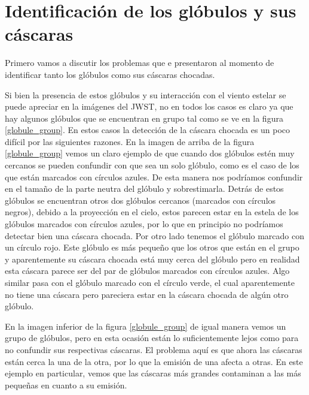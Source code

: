\documentclass{book}
\begin{document}
\section{Identificación de los glóbulos y sus cáscaras}\label{dis:casaras}

Primero vamos a discutir los problemas que e presentaron al momento de identificar tanto los glóbulos como sus cáscaras chocadas.

Si bien la presencia de estos glóbulos y su interacción con el viento estelar se puede apreciar en la imágenes del JWST, no en todos los casos es claro ya que hay algunos glóbulos que se encuentran en grupo tal como se ve en la figura \ref{globule_group}. En estos casos la detección de la cáscara chocada es un poco difícil por las siguientes razones. En la imagen de arriba de la figura \ref{globule_group} vemos un claro ejemplo de que cuando dos glóbulos estén muy cercanos se pueden confundir con que sea un solo glóbulo, como es el caso de los que están marcados con círculos azules. De esta manera nos podríamos confundir en el tamaño de la parte neutra del glóbulo y sobrestimarla. Detrás de estos glóbulos se encuentran otros dos glóbulos cercanos (marcados con círculos negros), debido a la proyección en el cielo, estos parecen estar en la estela de los glóbulos marcados con círculos azules, por lo que en principio no podríamos detectar bien una cáscara chocada. Por otro lado tenemos el glóbulo marcado con un círculo rojo. Este glóbulo es más pequeño que los otros que están en el grupo y aparentemente su cáscara chocada está muy cerca del glóbulo pero en realidad esta cáscara parece ser del par de glóbulos marcados con círculos azules. Algo similar pasa con el glóbulo marcado con el círculo verde, el cual aparentemente no tiene una cáscara pero pareciera estar en la cáscara chocada de algún otro glóbulo.

En la imagen inferior de la figura \ref{globule_group} de igual manera vemos un grupo de glóbulos, pero en esta ocasión están lo suficientemente lejos como para no confundir sus respectivas cáscaras. El problema aquí es que ahora las cáscaras están cerca la una de la otra, por lo que la emisión de una afecta a otras. En este ejemplo en particular, vemos que las cáscaras más grandes contaminan a las más pequeñas en cuanto a su emisión.\\
\end{document}
